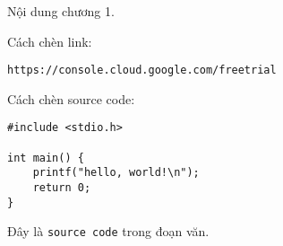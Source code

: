 \documentclass[../thesis.tex]{subfiles}
\begin{document}
Nội dung chương 1.

Cách chèn link:

\begin{Verbatim}
https://console.cloud.google.com/freetrial
\end{Verbatim}

Cách chèn source code:

\begin{Verbatim}
#include <stdio.h>

int main() {
	printf("hello, world!\n");
	return 0;
}
\end{Verbatim}

Đây là \texttt{source code} trong đoạn văn.
	
\end{document}
